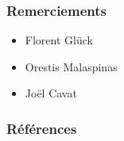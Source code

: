 \documentclass[10pt]{beamer}
\begin{document}
\begin{frame}
    \frametitle{Remerciements}
    \begin{itemize}
        \item Florent Glück
        \item Orestis Malaspinas
        \item Joël Cavat
    \end{itemize}
\end{frame}


\begin{frame}[allowframebreaks]
    \frametitle{Références}
    \fontsize{4pt}{4}\selectfont
	
	
\end{frame}
\end{document}
